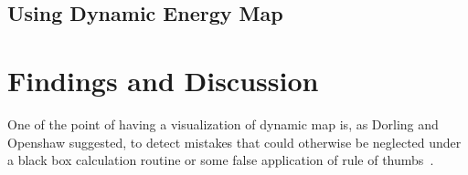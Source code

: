 \documentclass[hidelinks,12pt]{article}
\begin{document}
\subsection{Using Dynamic Energy Map}

\section{Findings and Discussion}
One of the point of having a visualization of dynamic map is, as
Dorling and Openshaw suggested, to detect mistakes that could
otherwise be neglected under a black box calculation routine or some
false application of rule of thumbs~\cite{Dorling1992}.

\begin{comment}
\item Conclusion
  \begin{enumerate}[label*=\arabic*.]
  \item Summary of the current approach in implementing the dynamic
    Energy Map
  \item Limitations of the current implementation
    \begin{enumerate}[label*=\arabic*.]
    \item Simplified building simulation assumption about urban
      environment
    \item Lack of user choices for the stand-alone user interface as a
      result of its dependence on existing modeling softwares
    \end{enumerate}
  \item Future Expansion of the project
    \begin{enumerate}[label*=\arabic*.]
    \item Adding information of the supply side: residual energy,
      sustainable energy
    \item Providing different interfaces for different user population
    \item 2D and 3D compatible \\The reason for providing 2D map
      together with 3D map is that 2D maps have the following good
      properties:
      \begin{enumerate}[label*=\arabic*.]
      \item Better for region selection and spatial navigation than 3D
        map
      \item Better for conveying spatial relationship that does not
        involve height induced variation
      \item For larger scale display of city, state or nationwide, 3D

\end{comment}
\end{document}
